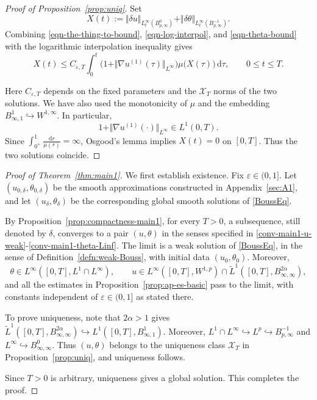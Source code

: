 \documentclass[reqno,11pt,a4paper]{amsart}
\newcommand{\dd}{\mathrm{d}}
\begin{document}
\begin{proof}[Proof of Proposition~\ref{prop:uniq}]
Set
\[
  X(t):=
  \Vert \delta u\Vert _{L^\infty_t(B^0_{p,\infty})}
  +
  \Vert \delta\theta\Vert _{L^\infty_t(B^{-1}_{p,\infty})}.
\]
Combining \eqref{eqn-the-thing-to-bound},
\eqref{eqn-log-interpol}, and \eqref{eqn-theta-bound}
with the logarithmic interpolation inequality gives
\[
  X(t)
  \leq
  C_{\varepsilon,T}
  \int_0^t
  \bigl(
    1+\Vert \nabla u^{(1)}(\tau)\Vert _{L^\infty}
  \bigr)
  \mu\bigl(X(\tau)\bigr)\,\dd\tau,
  \qquad 0\leq t\leq T.
\]

Here $C_{\varepsilon,T}$ depends on the fixed parameters
and the $\mathcal X_T$ norms of the two solutions.
We have also used the monotonicity of $\mu$
and the embedding
$B^1_{\infty,1}\hookrightarrow W^{1,\infty}$.
In particular,
\[
  1+\Vert \nabla u^{(1)}(\cdot)\Vert _{L^\infty}
  \in L^1(0,T).
\]
Since
$\int_{0^+}^1\frac{\dd r}{\mu(r)}=\infty$,
Osgood's lemma implies $X(t)=0$ on $[0,T]$.
Thus the two solutions coincide.
\end{proof}

\begin{proof}[Proof of Theorem~\ref{thm:main1}]
We first establish existence.
Fix $\varepsilon\in(0,1]$.
Let $(u_{0,\delta},\theta_{0,\delta})$
be the smooth approximations constructed in
Appendix~\ref{sec:A1}, and let
$(u_\delta,\theta_\delta)$
be the corresponding global smooth solutions
of \eqref{BoussEq}.

By Proposition~\ref{prop:compactness-main1},
for every $T>0$, a subsequence,
still denoted by $\delta$, converges to a pair
$(u,\theta)$ in the senses specified in
\eqref{conv-main1-u-weak}-\eqref{conv-main1-theta-Linf}.
The limit is a weak solution of \eqref{BoussEq},
in the sense of Definition~\ref{defn:weak-Bouss},
with initial data $(u_0,\theta_0)$.
Moreover,
\[
  \theta\in L^\infty([0,T],L^1\cap L^\infty),
  \qquad
  u\in L^\infty([0,T],W^{1,p})
  \cap\widetilde L^1([0,T],B^{2\alpha}_{\infty,\infty}),
\]
and all the estimates in
Proposition~\ref{prop:ap-es-basic}
pass to the limit, with constants independent of
$\varepsilon\in(0,1]$ as stated there.

To prove uniqueness, note that $2\alpha>1$ gives
$\widetilde L^1([0,T],B^{2\alpha}_{\infty,\infty})\hookrightarrow
  L^1([0,T],B^1_{\infty,1})$.
Moreover,
$L^1\cap L^\infty \hookrightarrow L^p \hookrightarrow B^{-1}_{p,\infty}$ and 
$L^\infty\hookrightarrow B^0_{\infty,\infty}$.
Thus $(u,\theta)$ belongs to the uniqueness class
$\mathcal X_T$
in Proposition~\ref{prop:uniq},
and uniqueness follows.

Since $T>0$ is arbitrary, uniqueness gives a global solution.
This completes the proof.
\end{proof}
\end{document}
